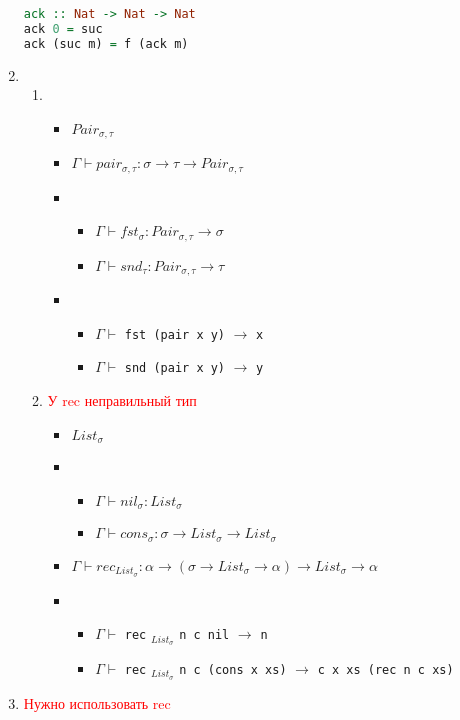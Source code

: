 \documentclass[12pt,a4paper]{article}
\begin{document}
\begin{enumerate}
{\begin{enumerate}
{\begin{lstlisting}[language=Haskell]
ack :: Nat -> Nat -> Nat
ack 0 = suc
ack (suc m) = f (ack m)
			\end{lstlisting}
		}
	\end{enumerate}
}
\item {
	\begin{enumerate}
	\item {
		\begin{itemize}
			\item $Pair_{\sigma,\tau}$
			\item $\Gamma \vdash pair_{\sigma,\tau} \colon \sigma \rightarrow \tau \rightarrow Pair_{\sigma,\tau}$
			\item {
				\begin{itemize}
					\item $\Gamma \vdash fst_{\sigma} \colon Pair_{\sigma,\tau} \rightarrow \sigma$
					\item $\Gamma \vdash snd_{\tau} \colon Pair_{\sigma,\tau} \rightarrow \tau$
				\end{itemize}
			}
			\item {
				\begin{itemize}
					\item $\Gamma \vdash$ \texttt{fst (pair x y)} $\rightarrow$ \texttt{x}
					\item $\Gamma \vdash$ \texttt{snd (pair x y)} $\rightarrow$ \texttt{y}
				\end{itemize}
			}
		\end{itemize}
	}
	\item {
\textcolor{red}{У rec неправильный тип}
		\begin{itemize}
			\item $List_{\sigma}$
			\item {
				\begin{itemize}
					\item $\Gamma \vdash nil_{\sigma} \colon List_{\sigma}$
					\item $\Gamma \vdash cons_{\sigma} \colon \sigma \rightarrow List_{\sigma} \rightarrow List_{\sigma}$
				\end{itemize}
			}
			\item $\Gamma \vdash rec_{List_{\sigma}} \colon \alpha \rightarrow (\sigma \rightarrow List_{\sigma} \rightarrow \alpha) \rightarrow List_{\sigma} \rightarrow \alpha$
			\item {
				\begin{itemize}
					\item $\Gamma \vdash$ \texttt{rec} $_{List_{\sigma}}$ \texttt{n c nil} $\rightarrow$ \texttt{n}
					\item $\Gamma \vdash$ \texttt{rec} $_{List_{\sigma}}$ \texttt{n c (cons x xs)} $\rightarrow$ \texttt{c x xs (rec n c xs)}
				\end{itemize}
			}
		\end{itemize}
	}
	\end{enumerate}
}
\item
\textcolor{red}{Нужно использовать rec}

\end{enumerate}
\end{document}
